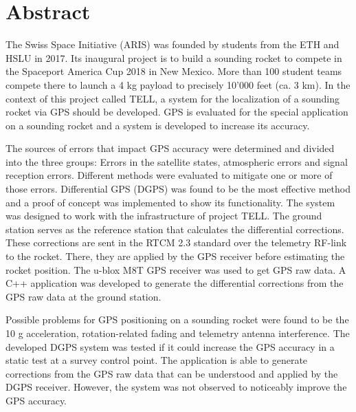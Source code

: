 \chapter*{Abstract}

The Swiss Space Initiative (ARIS) was founded by students from the ETH and HSLU in 2017.
Its inaugural project is to build a sounding rocket to compete in the Spaceport America Cup 2018 in New Mexico.
More than 100 student teams compete there to launch a 4 kg payload to precisely 10'000 feet (ca. 3 km).
In the context of this project called TELL, a system for the localization of a sounding rocket via GPS should be developed.
GPS is evaluated for the special application on a sounding rocket and a system is developed to increase its accuracy.

The sources of errors that impact GPS accuracy were determined and divided into the three groups: Errors in the satellite states, atmospheric errors and signal reception errors.
Different methods were evaluated to mitigate one or more of those errors.
Differential GPS (DGPS) was found to be the most effective method and a proof of concept was implemented to show its functionality.
The system was designed to work with the infrastructure of project TELL.
The ground station serves as the reference station that calculates the differential corrections.
These corrections are sent in the RTCM 2.3 standard over the telemetry RF-link to the rocket.
There, they are applied by the GPS receiver before estimating the rocket position.
The u-blox M8T GPS receiver was used to get GPS raw data.
A C++ application was developed to generate the differential corrections from the GPS raw data at the ground station.

Possible problems for GPS positioning on a sounding rocket were found to be the 10 g acceleration, rotation-related fading and telemetry antenna interference.
The developed DGPS system was tested if it could increase the GPS accuracy in a static test at a survey control point.
The application is able to generate corrections from the GPS raw data that can be understood and applied by the DGPS receiver.
However, the system was not observed to noticeably improve the GPS accuracy.